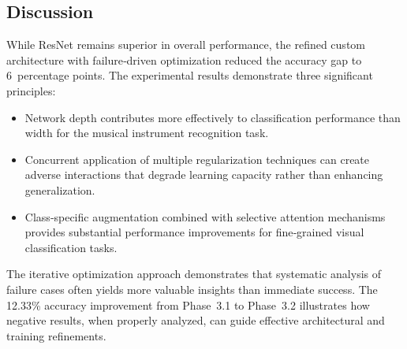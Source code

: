 \subsection{Discussion}

\noindent
While ResNet remains superior in overall performance, the refined custom architecture with failure‑driven optimization reduced the accuracy gap to 6~percentage points. The experimental results demonstrate three significant principles:
\begin{itemize}
    \item Network depth contributes more effectively to classification performance than width for the musical instrument recognition task.
    \item Concurrent application of multiple regularization techniques can create adverse interactions that degrade learning capacity rather than enhancing generalization.
    \item Class‑specific augmentation combined with selective attention mechanisms provides substantial performance improvements for fine‑grained visual classification tasks.
\end{itemize}

\noindent
The iterative optimization approach demonstrates that systematic analysis of failure cases often yields more valuable insights than immediate success. The 12.33\% accuracy improvement from Phase~3.1 to Phase~3.2 illustrates how negative results, when properly analyzed, can guide effective architectural and training refinements.
